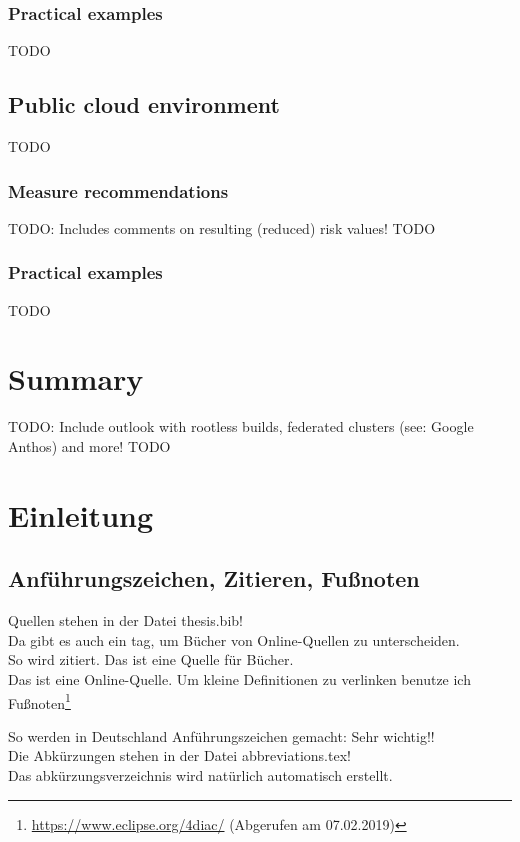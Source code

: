 \subsection{Practical examples}
TODO

\section{Public cloud environment}
TODO

\subsection{Measure recommendations}
TODO: Includes comments on resulting (reduced) risk values!
TODO

\subsection{Practical examples}
TODO

\chapter{Summary}
TODO: Include outlook with rootless builds, federated clusters (see: Google Anthos) and more!
TODO



\chapter{Einleitung}
\section{Anführungszeichen, Zitieren, Fußnoten} 
\label{kap:beschda}
Quellen stehen in der Datei thesis.bib!\\
Da gibt es auch ein tag, um Bücher von Online-Quellen zu unterscheiden.\\

So wird zitiert\cite{booktest}. Das ist eine Quelle für Bücher. \\
Das ist eine Online-Quelle\cite{wikimoscow}.
Um kleine Definitionen zu verlinken benutze ich Fußnoten\footnote{\url{ https://www.eclipse.org/4diac/} (Abgerufen am 07.02.2019)}

So werden in Deutschland Anführungszeichen gemacht: \glqq Sehr wichtig!!\grqq{}  \\

Die Abkürzungen stehen in der Datei abbreviations.tex! \\
Das abkürzungsverzeichnis wird natürlich automatisch erstellt.\\

